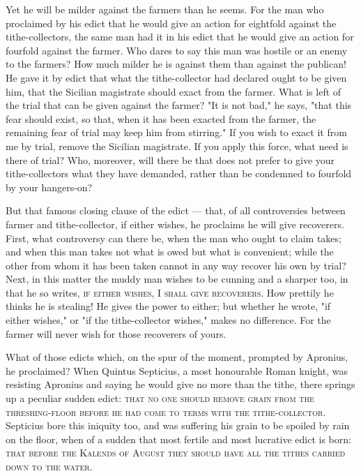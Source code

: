  Yet he will be milder against the farmers than he seems. For the man who proclaimed by his edict that he would give an action for eightfold against the tithe-collectors, the same man had it in his edict that he would give an action for fourfold against the farmer. Who dares to say this man was hostile or an enemy to the farmers? How much milder he is against them than against the publican! He gave it by edict that what the tithe-collector had declared ought to be given him, that the Sicilian magistrate should exact from the farmer. What is left of the trial that can be given against the farmer? "It is not bad," he says, "that this fear should exist, so that, when it has been exacted from the farmer, the remaining fear of trial may keep him from stirring." If you wish to exact it from me by trial, remove the Sicilian magistrate. If you apply this force, what need is there of trial? Who, moreover, will there be that does not prefer to give your tithe-collectors what they have demanded, rather than be condemned to fourfold by your hangers-on?

 But that famous closing clause of the edict --- that, of all controversies between farmer and tithe-collector, if either wishes, he proclaims he will give recoverers. First, what controversy can there be, when the man who ought to claim takes; and when this man takes not what is owed but what is convenient; while the other from whom it has been taken cannot in any way recover his own by trial? Next, in this matter the muddy man wishes to be cunning and a sharper too, in that he so writes, \textsc{if either wishes, I shall give recoverers}. How prettily he thinks he is stealing! He gives the power to either; but whether he wrote, "if either wishes," or "if the tithe-collector wishes," makes no difference. For the farmer will never wish for those recoverers of yours.

 What of those edicts which, on the spur of the moment, prompted by Apronius, he proclaimed? When Quintus Septicius, a most honourable Roman knight, was resisting Apronius and saying he would give no more than the tithe, there springs up a peculiar sudden edict: \textsc{that no one should remove grain from the threshing-floor before he had come to terms with the tithe-collector}. Septicius bore this iniquity too, and was suffering his grain to be spoiled by rain on the floor, when of a sudden that most fertile and most lucrative edict is born: \textsc{that before the Kalends of August they should have all the tithes carried down to the water}.

